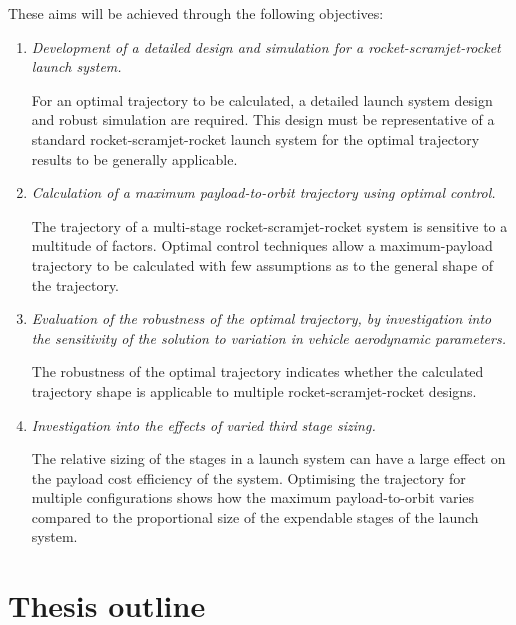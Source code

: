     
\vspace*{10pt}
    \noindent These aims will be achieved through the following objectives:
    \begin{enumerate}
    	 \item \emph{Development of a detailed design and simulation for a rocket-scramjet-rocket launch system.}
    	 
    	   For an optimal trajectory to be calculated, a detailed launch system design and robust simulation are required. This design must be representative of a standard rocket-scramjet-rocket launch system for the optimal trajectory results to be generally applicable.\\

\item \emph{Calculation of a maximum payload-to-orbit trajectory using optimal control.}

The trajectory of a multi-stage rocket-scramjet-rocket system is sensitive to a multitude of factors. Optimal control techniques allow a maximum-payload trajectory to be calculated with few assumptions as to the general shape of the trajectory. \\
    	
      \item \emph{Evaluation of the robustness of the optimal trajectory, by investigation into the sensitivity of the solution to variation in vehicle aerodynamic parameters.} 

The robustness of the optimal trajectory indicates whether the calculated trajectory shape is applicable to multiple rocket-scramjet-rocket designs. \\

      \item \emph{Investigation into the effects of varied third stage sizing.}

The relative sizing of the stages in a launch system can have a large effect on the payload cost efficiency of the system. Optimising the trajectory for multiple configurations shows how the maximum payload-to-orbit varies compared to the proportional size of the expendable stages of the launch system. \\


    \end{enumerate}

  \clearpage
  \section{Thesis outline}

